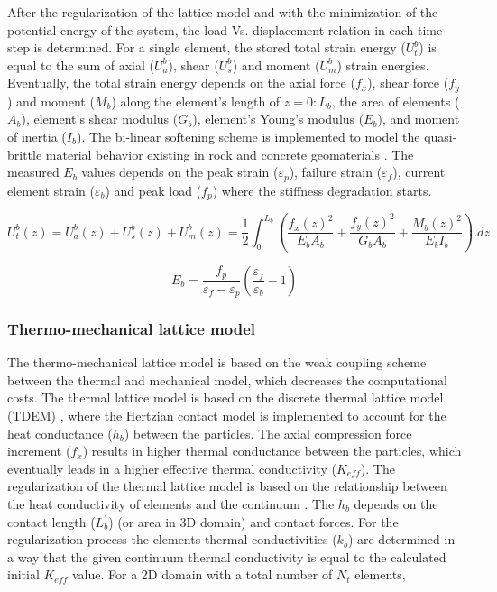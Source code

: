 After the regularization of the lattice model and with the minimization of the potential energy of the system, the load Vs. displacement relation in each time step is determined. For a single element, the stored total strain energy ($U_t^b$) is equal to the sum of axial ($U_a^b$), shear ($U_s^b$) and moment ($U_m^b$) strain energies. Eventually, the total strain energy depends on the axial force ($f_x$), shear force ($f_y$) and moment ($M_b$) along the element's length of $z=0:L_b$, the area of elements ($A_b$), element's shear modulus ($G_b$), element's Young's modulus ($E_b$), and moment of inertia ($I_b$). The bi-linear softening scheme is implemented to model the quasi-brittle material behavior existing in rock and concrete geomaterials \cite{Inceetal2003}. The measured $E_b$ values depends on the peak strain ($\varepsilon_p$), failure  strain ($\varepsilon_f$), current element strain ($\varepsilon_b$) and peak load ($f_p$) where the stiffness degradation starts.

\begin{equation}
\label{eq:LEM_Mechanical_8}
 U_t^b(z)=U_a^b(z)+U_s^b(z)+U_m^b(z)=\frac{1}{2}\int_{0}^{L_b}{\left(\frac{f_x{(z)}^2}{E_b A_b}+\frac{f_y{(z)}^2}{G_b A_b}+\frac{M_b{(z)}^2}{E_b I_b}\right).dz} 
\end{equation}

\begin{equation}
\label{eq:LEM_Mechanical_9}
E_b=\frac{f_p}{\varepsilon_f-\varepsilon_p}\left(\frac{\varepsilon_f}{\varepsilon_b}-1\right)
\end{equation}

\subsubsection*{Thermo-mechanical lattice model}

The thermo-mechanical lattice model is based on the weak coupling scheme between the thermal and mechanical model, which decreases the computational costs. The thermal lattice model is based on the discrete thermal lattice model (TDEM) \cite{Zhangetal2011, Fengetal2008}, where the Hertzian contact model is implemented to account for the heat conductance ($h_b$) between the particles. The axial compression force increment ($f_x$) results in higher thermal conductance between the particles, which eventually leads in a higher effective thermal conductivity ($K_{eff}$). The regularization of the thermal lattice model is based on the relationship between the heat conductivity of elements and the continuum \cite{Rizvietal2018b}. The $h_b$ depends on the contact length ($L_b^\prime$) (or area in 3D domain) and contact forces. For the regularization process the elements thermal conductivities ($k_{b}$) are determined in a way that the given continuum thermal conductivity is equal to the calculated initial $K_{eff}$ value. For a 2D domain with a total number of $N_t$ elements,


